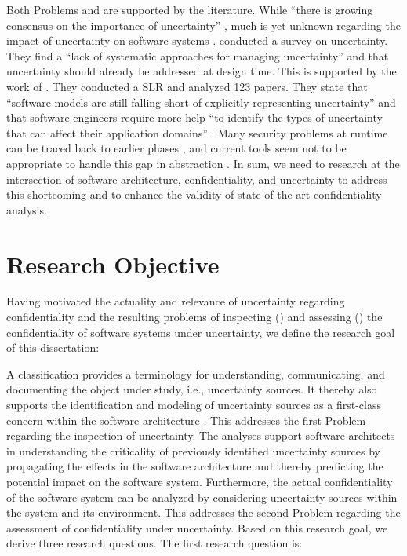 Both Problems  and  are supported by the literature.
While \enquote{there is growing consensus on the importance of uncertainty} \cite{hezavehi_uncertainty_2021}, much is yet unknown regarding the impact of uncertainty on software systems \cite{garlan_software_2010}.
\textcite{hezavehi_uncertainty_2021} conducted a survey on uncertainty.
They find a \enquote{lack of systematic approaches for managing uncertainty} \cite{hezavehi_uncertainty_2021} and that uncertainty should already be addressed at design time.
This is supported by the work of \textcite{troya_uncertainty_2021}.
They conducted a \ac{SLR} and analyzed 123 papers.
They state that \enquote{software models are still falling short of explicitly representing uncertainty} \cite{troya_uncertainty_2021} and that
software engineers require more help \enquote{to identify the types of uncertainty that can affect their application domains} \cite{troya_uncertainty_2021}.
Many security problems at runtime can be traced back to earlier phases \cite{gurses_eliciting_2005}, and current tools seem not to be appropriate to handle this gap in abstraction \cite{bauer_real_2009}.
In sum, we need to research at the intersection of software architecture, confidentiality, and uncertainty to address this shortcoming and to enhance the validity of state of the art confidentiality analysis.





\section{Research Objective}%
\label{sec:introduction:research}

Having motivated the actuality and relevance of uncertainty regarding confidentiality and the resulting problems of inspecting () and assessing () the confidentiality of software systems under uncertainty, we define the research goal of this dissertation:

\ResearchGoal

A classification provides a terminology for understanding, communicating, and documenting the object under study, i.e., uncertainty sources.
It thereby also supports the identification and modeling of uncertainty sources as a first-class concern within the software architecture \cite{garlan_software_2010}.
This addresses the first Problem  regarding the inspection of uncertainty.
The analyses support software architects in understanding the criticality of previously identified uncertainty sources by propagating the effects in the software architecture and thereby predicting the potential impact on the software system.
Furthermore, the actual confidentiality of the software system can be analyzed by considering uncertainty sources within the system and its environment.
This addresses the second Problem  regarding the assessment of confidentiality under uncertainty.
Based on this research goal, we derive three research questions. 
The first research question is:


